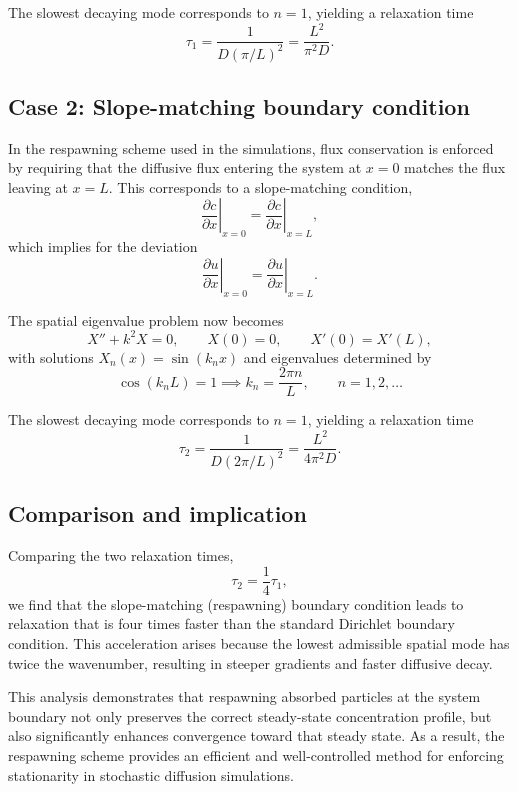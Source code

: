 The slowest decaying mode corresponds to $n = 1$, yielding a relaxation time
\begin{equation}
    \tau_{1} = \frac{1}{D(\pi/L)^{2}} = \frac{L^{2}}{\pi^{2} D}.
    \label{eq:tau1}
\end{equation}

\subsection{Case 2: Slope-matching boundary condition}\label{sec:case2}
In the respawning scheme used in the simulations, flux conservation is enforced by requiring that the diffusive flux entering the system at $x = 0$ matches the flux leaving at $x = L$.
This corresponds to a slope-matching condition,
\begin{equation}
    \left.\frac{\partial c}{\partial x}\right|_{x=0} = \left.\frac{\partial c}{\partial x}\right|_{x=L},
    \label{eq:slope_match}
\end{equation}
which implies for the deviation
\begin{equation}
    \left.\frac{\partial u}{\partial x}\right|_{x=0} = \left.\frac{\partial u}{\partial x}\right|_{x=L}.
    \label{eq:slope_match_u}
\end{equation}

The spatial eigenvalue problem now becomes
\begin{equation}
    X'' + k^{2} X = 0, \qquad X(0) = 0, \qquad X'(0) = X'(L),
    \label{eq:eigen_slope}
\end{equation}
with solutions $X_{n}(x) = \sin(k_{n} x)$ and eigenvalues determined by
\begin{equation}
    \cos(k_{n} L) = 1 \implies k_{n} = \frac{2\pi n}{L}, \qquad n = 1, 2, \ldots
    \label{eq:kn_slope}
\end{equation}

The slowest decaying mode corresponds to $n = 1$, yielding a relaxation time
\begin{equation}
    \tau_{2} = \frac{1}{D(2\pi/L)^{2}} = \frac{L^{2}}{4\pi^{2} D}.
    \label{eq:tau2}
\end{equation}

\subsection{Comparison and implication}\label{sec:comparison}
Comparing the two relaxation times,
\begin{equation}
    \tau_{2} = \frac{1}{4}\tau_{1},
    \label{eq:tau_ratio}
\end{equation}
we find that the slope-matching (respawning) boundary condition leads to relaxation that is four times faster than the standard Dirichlet boundary condition.
This acceleration arises because the lowest admissible spatial mode has twice the wavenumber, resulting in steeper gradients and faster diffusive decay.

This analysis demonstrates that respawning absorbed particles at the system boundary not only preserves the correct steady-state concentration profile, but also significantly enhances convergence toward that steady state.
As a result, the respawning scheme provides an efficient and well-controlled method for enforcing stationarity in stochastic diffusion simulations.
